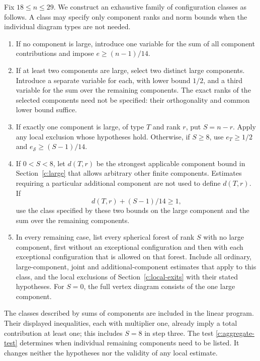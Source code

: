 \documentclass[11pt]{article}
\theoremstyle{definition}
\theoremstyle{remark}
\numberwithin{equation}{section}
\begin{document}
Fix $18\le n\le29$. We construct an exhaustive family of
configuration classes as follows. A class may specify only component
ranks and norm bounds when the individual diagram types are not needed.

\begin{enumerate}[label=\textup{\arabic*.},leftmargin=*]
\item If no component is large, introduce one variable for the sum of
 all component contributions and impose $e\ge(n-1)/14$.
\item If at least two components are large, select two distinct large
 components. Introduce a separate variable for each, with lower bound
 $1/2$, and a third variable for the sum over the remaining components.
 The exact ranks of the selected components need not be specified:
 their orthogonality and common lower bound suffice.
\item If exactly one component is large, of type $T$ and rank $r$, put
 $S=n-r$. Apply any local exclusion whose hypotheses hold. Otherwise,
 if $S\ge8$, use $e_T\ge1/2$ and
 $e_{\mathcal S}\ge(S-1)/14$.
\item If $0<S<8$, let $d(T,r)$ be the strongest applicable component
 bound in Section~\ref{c:large} that allows arbitrary other finite
 components. Estimates requiring a particular additional component
 are not used to define $d(T,r)$. If
 \begin{equation}\label{c:aggregate-test}
                  d(T,r)+(S-1)/14\ge1,
 \end{equation}
 use the class specified by these two bounds on the large component
 and the sum over the remaining components.
\item In every remaining case, list every spherical forest of rank
 $S$ with no large component, first without an exceptional configuration
 and then with each exceptional configuration that is allowed on that forest. Include all ordinary, large-component,
 joint and additional-component estimates that apply to this class,
 and the local exclusions of Section~\ref{c:local-exits} with their
 stated hypotheses. For $S=0$, the full vertex diagram consists of
 the one large component.
\end{enumerate}

The classes described by sums of components are included in the linear
program. Their displayed inequalities, each with multiplier one,
already imply a total contribution at least one; this includes
$S=8$ in step three. The test \eqref{c:aggregate-test} determines
when individual remaining components need to be listed. It changes
neither the hypotheses nor the validity of any local estimate.
\end{document}
